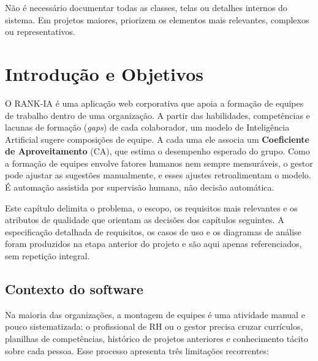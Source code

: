 \documentclass[a4paper,12pt,oneside,openany]{book}
\newif\iforientacoes
\newcommand{\orientacao}[1]{%
    \iforientacoes
        \begin{quote}
        \small\itshape\textbf{Orientação:} #1
        \end{quote}
    \fi
}
\begin{document}
Não é necessário documentar todas as classes, telas ou detalhes internos do
sistema. Em projetos maiores, priorizem os elementos mais relevantes,
complexos ou representativos.

\clearpage
\fi

\chapter{Introdução e Objetivos}

\orientacao{Apresentem brevemente o sistema e expliquem o que será documentado
neste capítulo. O objetivo é permitir que um leitor compreenda o problema e o
escopo antes de examinar as decisões de projeto.}

O RANK-IA é uma aplicação web corporativa que apoia a formação de equipes de
trabalho dentro de uma organização. A partir das habilidades, competências e
lacunas de formação (\textit{gaps}) de cada colaborador, um modelo de
Inteligência Artificial sugere composições de equipe. A cada uma ele associa um
\textbf{Coeficiente de Aproveitamento} (CA), que estima o desempenho esperado
do grupo. Como a formação de equipes envolve fatores humanos nem sempre
mensuráveis, o gestor pode ajustar as sugestões manualmente, e esses ajustes
retroalimentam o modelo. É automação assistida por supervisão humana, não
decisão automática.

Este capítulo delimita o problema, o escopo, os requisitos mais relevantes e os
atributos de qualidade que orientam as decisões dos capítulos seguintes. A
especificação detalhada de requisitos, os casos de uso e os diagramas de
análise foram produzidos na etapa anterior do projeto e são aqui apenas
referenciados, sem repetição integral.

\section{Contexto do software}

\orientacao{Contextualizem o problema do ponto de vista dos usuários e da
atividade que o software deve apoiar, automatizar ou melhorar. Identifiquem os
principais usuários ou partes interessadas quando isso for relevante.}

Na maioria das organizações, a montagem de equipes é uma atividade manual e
pouco sistematizada: o profissional de RH ou o gestor precisa cruzar
currículos, planilhas de competências, histórico de projetos anteriores e
conhecimento tácito sobre cada pessoa. Esse processo apresenta três
limitações recorrentes:
\end{document}
